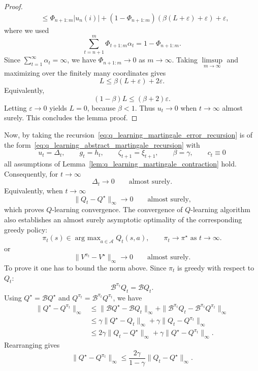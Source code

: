 \documentclass{article}
\numberwithin{equation}{section}
\newcommand{\norm}[1]{\|#1\|}
\newcommand{\cA}{\mathcal{A}}
\renewcommand{\epsilon}{\varepsilon}
\DeclareMathOperator*{\argmax}{arg\ max}
\begin{document}
\begin{proof}
\begin{align*}
    &\le
    \Phi_{n+1:m}|u_n(i)|
    +
    \left(1-\Phi_{n+1:m}\right)
    \left(\beta(L+\epsilon)+\epsilon\right)
    +
    \epsilon,
\end{align*}
where we used
\[
    \sum_{t=n+1}^{m}\Phi_{t+1:m}\alpha_t
    =
    1-\Phi_{n+1:m}.
\]
Since \(\sum\limits_{t = 1}^{\infty}\alpha_t=\infty\), we have \(\Phi_{n+1:m}\to0\) as \(m\to\infty\). Taking \(\limsup\limits_{m\to\infty}\) and maximizing over the finitely many coordinates gives
\[
    L\le \beta(L+\epsilon)+2\epsilon.
\]
Equivalently,
\[
    (1-\beta)L\le(\beta+2)\epsilon.
\]
Letting \(\epsilon\rightarrow0\) yields \(L=0\), because \(\beta<1\). Thus \(u_t\to0\) when \(t\rightarrow\infty\) almost surely. This concludes the lemma proof.
\end{proof}

Now, by taking the recursion~\eqref{eq:q_learning_martingale_error_recursion} is of the form~\eqref{eq:q_learning_abstract_martingale_recursion} with
\[
    u_t=\Delta_t,
    \qquad
    g_t=h_t,
    \qquad
    \zeta_{t+1}=\xi_{t+1},
    \qquad
    \beta=\gamma,
    \qquad
    c_t\equiv0
\]
all assumptions of Lemma~\ref{lem:q_learning_martingale_contraction} hold. Consequently, for \(t\rightarrow\infty\)
\[
    \Delta_t\to0
    \qquad
    \text{almost surely.}
\]
Equivalently, when \(t\rightarrow\infty\)
\[
    \norm{Q_t-Q^\star}_\infty\to0
    \qquad
    \text{almost surely,}
\]
which proves $Q$-learning convergence. The convergence of $Q$-learning algorithm also establishes an almost surely asymptotic optimality of the corresponding greedy policy:
\[
    \pi_t(s)\in\argmax_{a\in\cA}Q_t(s,a),\qquad\pi_t\rightarrow\pi^\star\text{ as }t\rightarrow\infty.
\]
or
\[
    \norm{V^{\pi_t}-V^\star}_\infty\to0
    \qquad
    \text{almost surely.}
\]
To prove it one has to bound the norm above. Since \(\pi_t\) is greedy with respect to \(Q_t\):
\[
    \mathcal{B}^{\pi_t}Q_t=\mathcal{B}Q_t.
\]
Using \(Q^\star=\mathcal{B}Q^\star\) and \(Q^{\pi_t}=\mathcal{B}^{\pi_t}Q^{\pi_t}\), we have
\begin{align*}
    \norm{Q^\star-Q^{\pi_t}}_\infty
    &\le
    \norm{\mathcal{B}Q^\star-\mathcal{B}Q_t}_\infty
    +
    \norm{\mathcal{B}^{\pi_t}Q_t-\mathcal{B}^{\pi_t}Q^{\pi_t}}_\infty
    \\
    &\le
    \gamma\norm{Q^\star-Q_t}_\infty
    +
    \gamma\norm{Q_t-Q^{\pi_t}}_\infty
    \\
    &\le
    2\gamma\norm{Q_t-Q^\star}_\infty
    +
    \gamma\norm{Q^\star-Q^{\pi_t}}_\infty.
\end{align*}
Rearranging gives
\[
    \norm{Q^\star-Q^{\pi_t}}_\infty
    \le
    \frac{2\gamma}{1-\gamma}\norm{Q_t-Q^\star}_\infty.
\]
\end{document}
